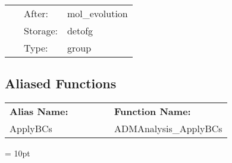  \begin{tabular*}{160mm}{cll} 
~ & After:  & mol\_evolution \\ 
~ & Storage:  & detofg \\ 
~ & Type:  & group \\ 
\end{tabular*} 


\subsection*{Aliased Functions}

\hspace{5mm}

 \begin{tabular*}{160mm}{ll} 

{\bf Alias Name:} ~~~~~~~ & {\bf Function Name:} \\ 
ApplyBCs & ADMAnalysis\_ApplyBCs \\ 
\end{tabular*} 



\vspace{5mm}\parskip = 10pt 
